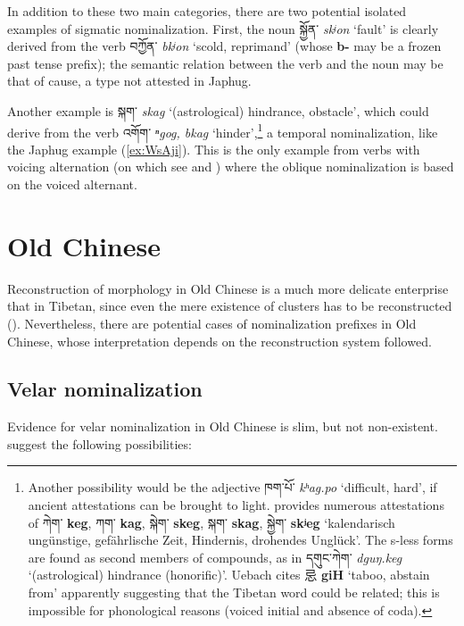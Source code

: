 \documentclass[oneside,a4paper,11pt]{article}
\newcommand{\ipa}[1]{\textbf{{\phon\mbox{#1}}}} %
\newcommand{\zh}[1]{{\cn #1}}
\newcommand{\tibet}[3]{{\tibetain#1} \textit{\phon#2} `#3'}
\newcommand{\tibetan}[1]{{\tibetain#1}}
\newcommand{\zhc}[2]{\zh{#1} \ipa{#2}}
\begin{document}
In addition to these two main categories, there are two potential isolated examples of sigmatic nominalization. First, the noun \tibet{སྐྱོན་}{skʲon}{fault} is clearly derived from the verb \tibet{བཀྱོན་}{bkʲon}{scold, reprimand} (whose \ipa{b-} may be a frozen past tense prefix); the semantic relation between the verb and the noun may be that of cause, a type not attested in Japhug. 

Another example is \tibet{སྐག་}{skag}{(astrological) hindrance, obstacle}, which could derive from the verb \tibet{འགོག་}{ⁿgog, bkag}{hinder},\footnote{Another possibility would be the adjective \tibet{ཁག་པོ་}{kʰag.po}{difficult, hard}, if ancient attestations can be brought to light. \citet[109]{uebach06woerterbuch02} provides numerous attestations of  \tibetan{ཀེག་} \ipa{keg}, \tibetan{ཀག་} \ipa{kag}, \tibetan{སྐེག་} \ipa{skeg}, \tibetan{སྐག་} \ipa{skag}, \tibetan{སྐྱེག་} \ipa{skʲeg} `kalendarisch ungünstige, gefährlische Zeit, Hindernis, drohendes Unglück'. The s-less forms are found as second members of compounds, as in \tibet{དགུང་ཀེག་}{dguŋ.keg}{(astrological) hindrance (honorific)}. Uebach cites \zhc{忌}{giH} `taboo, abstain from' apparently suggesting that the Tibetan word could be related; this is impossible for phonological reasons (voiced initial and absence of coda). } a temporal nominalization, like the Japhug example (\ref{ex:WsAji}). This is the only example from verbs with voicing alternation (on which see \citealt{jacques12internal} and \citealt{hill14voicing}) where the oblique nominalization is based on the voiced alternant.

 

\section{Old Chinese}
Reconstruction of morphology in Old Chinese is a much more delicate enterprise that in Tibetan, since even the mere existence of clusters has to be reconstructed (\citealt{gong17clusters}). Nevertheless, there are potential cases of nominalization prefixes in Old Chinese, whose interpretation depends on the reconstruction system followed.

\subsection{Velar nominalization}
Evidence for velar nominalization in Old Chinese is slim, but not non-existent. \citet[57]{bs14oc} suggest the following possibilities:
\end{document}

